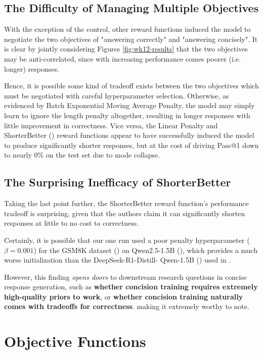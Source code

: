 \documentclass{article} %
\theoremstyle{definition}
\begin{document}
\subsection{The Difficulty of Managing Multiple Objectives}
With the exception of the control, other reward functions
induced the model to negotiate the two objectives of "answering correctly" 
and "answering concisely". It is clear by jointly considering
Figures \ref{fig:wk12-results} that the two objectives may be anti-correlated,
since with increasing performance comes poorer (i.e. longer) responses.

Hence, it is possible some kind of tradeoff exists between the two objectives
which must be negotiated with careful hyperparameter selection. Otherwise,
as evidenced by Batch Exponential Moving Average Penalty,
the model may simply learn to ignore the length penalty altogether,
resulting in longer responses with little improvement in correctness.
Vice versa, the Linear Penalty and ShorterBetter (\cite{ShorterBetter}) reward functions
appear to have successfully induced the model to produce significantly shorter responses,
but at the cost of driving Pass@1 down to nearly 0\% on the test set due to mode collapse.

\subsection{The Surprising Inefficacy of ShorterBetter}
Taking the last point further, the ShorterBetter reward function's performance tradeoff is surprising, 
given that the authors claim it can significantly shorten responses at little to no cost to correctness.

Certainly, it is possible that our one run used a 
poor penalty hyperparameter ($\beta = 0.001$) for the GSM8K dataset (\cite{gsm8k})
on Qwen2.5-1.5B (\cite{Qwen-et-al-2025}), which provides a much worse
initialization than the DeepSeek-R1-Distill-
Qwen-1.5B (\cite{r1}) used in \cite{ShorterBetter}.

However, this finding \textit{opens doors} to downstream research questions
in concise response generation, such as \textbf{whether concision training 
requires extremely high-quality priors to work}, or \textbf{whether
concision training naturally comes with tradeoffs for correctness}.
making it extremely worthy to note.



\appendix
\section{Objective Functions}
\end{document}
